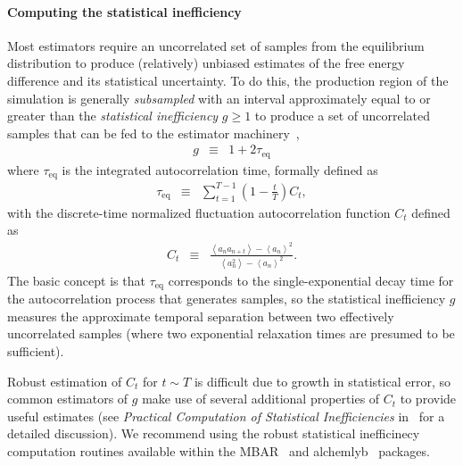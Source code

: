 \documentclass[9pt,bestpractices]{livecoms}
\newcommand{\expect}[1]{\left\langle{#1}\right\rangle}
\begin{document}
\paragraph{Computing the statistical inefficiency}
Most estimators require an uncorrelated set of samples from the equilibrium distribution to produce (relatively) unbiased estimates of the free energy difference and its statistical uncertainty.
To do this, the production region of the simulation is generally \emph{subsampled} with an interval approximately equal to or greater than the \emph{statistical inefficiency} $g \ge 1$ to produce a set of uncorrelated samples that can be fed to the estimator machinery~\cite{chodera2016simple},
\begin{eqnarray}
g &\equiv& 1 + 2 \tau_\mathrm{eq} \label{eq:statistical-inefficiency-definition}
\end{eqnarray}
where $\tau_\mathrm{eq}$ is the integrated autocorrelation time, formally defined as
\begin{eqnarray}
\tau_\mathrm{eq} &\equiv& \sum_{t=1}^{T-1} \left(1 - \frac{t}{T}\right) C_t \label{eq:integrated-autocorrelation-time-definition} , 
\end{eqnarray}
with the discrete-time normalized fluctuation autocorrelation function $C_t$ defined as
\begin{eqnarray}
C_t &\equiv& \frac{\expect{a_n a_{n+t}} - \expect{a_n}^2}{\expect{a_n^2} - \expect{a_n}^2} . \label{equation:autocorrelation-definition}
\end{eqnarray}
The basic concept is that $\tau_\mathrm{eq}$ corresponds to the single-exponential decay time for the autocorrelation process that generates samples, so the statistical inefficiency $g$ measures the approximate temporal separation between two effectively uncorrelated samples (where two exponential relaxation times are presumed to be sufficient).

Robust estimation of $C_t$ for $t \sim T$ is difficult due to growth in statistical error, so common estimators of $g$ make use of several additional properties of $C_t$ to provide useful estimates (see \emph{Practical Computation of Statistical Inefficiencies} in~\cite{chodera2016simple} for a detailed discussion).
We recommend using the robust statistical inefficinecy computation routines available within the MBAR~\cite{kylebeauchamp2019choderalab} and alchemlyb~\cite{daviddotson2019alchemistry} packages.
\end{document}
